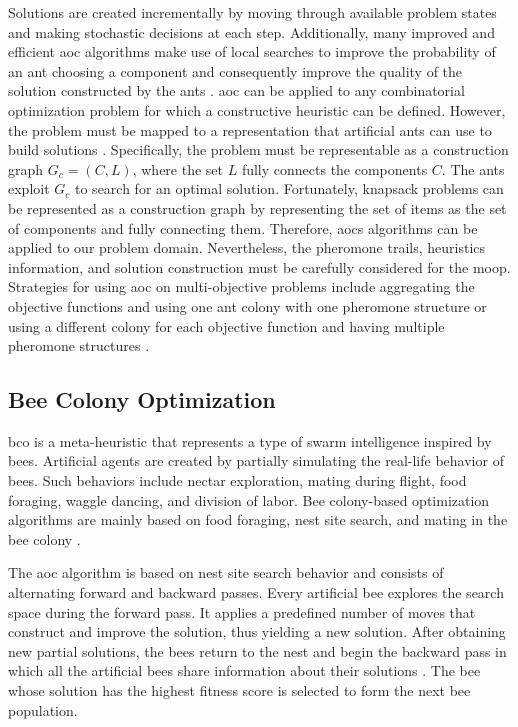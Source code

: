 Solutions are created incrementally by moving through available problem states and making stochastic decisions at each step. Additionally, many improved and efficient \gls{aoc} algorithms make use of local searches to improve the probability of an ant choosing a component and consequently improve the quality of the solution constructed by the ants \parencite{Stutzle2000MAX-MINSystem}. \Gls{aoc} can be applied to any combinatorial optimization problem for which a constructive heuristic can be defined. However, the problem must be mapped to a representation that artificial ants can use to build solutions \parencite{Dorigo2018TheMetaheuristic}. Specifically, the problem must be representable as a construction graph $G_c = (C, L)$, where the set $L$ fully connects the components $C$. The ants exploit $G_c$ to search for an optimal solution. Fortunately, knapsack problems can be represented as a construction graph by representing the set of items as the set of components and fully connecting them. Therefore, \glspl{aoc} algorithms can be applied to our problem domain. Nevertheless, the pheromone trails, heuristics information, and solution construction must be carefully considered for the \gls{moop}. Strategies for using \gls{aoc} on multi-objective problems include aggregating the objective functions and using one ant colony with one pheromone structure or using a different colony for each objective function and having multiple pheromone structures \parencite{Alaya2007AntProblems}.

\subsection{Bee Colony Optimization}
\Gls{bco} is a meta-heuristic that represents a type of swarm intelligence inspired by bees. Artificial agents are created by partially simulating the real-life behavior of bees. Such behaviors include nectar exploration, mating during flight, food foraging, waggle dancing, and division of labor. Bee colony-based optimization algorithms are mainly based on food foraging, nest site search, and mating in the bee colony \parencite{Talbi2009Metaheuristics:Implementation}.


The \gls{aoc} algorithm is based on nest site search behavior and consists of alternating forward and backward passes. Every artificial bee explores the search space during the forward pass. It applies a predefined number of moves that construct and improve the solution, thus yielding a new solution. After obtaining new partial solutions, the bees return to the nest and begin the backward pass in which all the artificial bees share information about their solutions \parencite{Teodorovic2009BeeBCO}. The bee whose solution has the highest fitness score is selected to form the next bee population.


